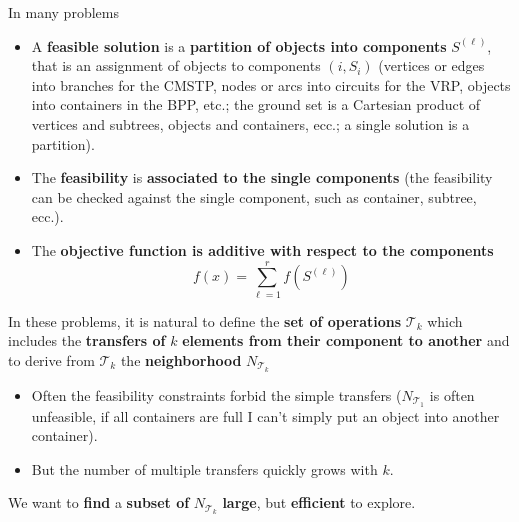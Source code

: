 In many problems
\begin{itemize}
	\item A \textbf{feasible solution} is a \textbf{partition of objects into components} $S^{(\ell)}$, that is an assignment of objects to components $(i, S_i )$ (vertices or edges into branches for the CMSTP, nodes or arcs into circuits for the VRP, objects into containers in the BPP, etc.; the ground set is a Cartesian product of vertices and subtrees, objects and containers, ecc.; a single solution is a partition).\\
	
	\item The \textbf{feasibility} is \textbf{associated to the single components} (the feasibility can be checked against the single component, such as container, subtree, ecc.).\\
	
	\item The \textbf{objective function is additive with respect to the components}
	$$ f (x) = \sum_{\ell = 1}^{r} f \left(S^{(\ell)} \right)$$
\end{itemize}

In these problems, it is natural to define the \textbf{set of operations} $\mathcal{T}_k$ which includes the \textbf{transfers of} $k$ \textbf{elements from their component to another} and to derive from $\mathcal{T}_k$ the \textbf{neighborhood} $N_{\mathcal{T}_k}$
\begin{itemize}
	\item Often the feasibility constraints forbid the simple transfers ($N_{\mathcal{T}_1}$ is often unfeasible, if all containers are full I can't simply put an object into another container).\\
	
	\item But the number of multiple transfers quickly grows with $k$.\\
\end{itemize}
We want to \textbf{find} a \textbf{subset of} $N_{\mathcal{T}_k}$ \textbf{large}, but \textbf{efficient} to explore.\\

\newpage

